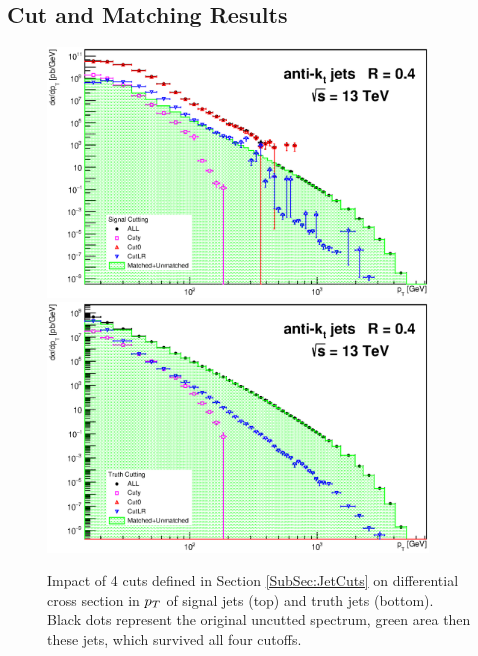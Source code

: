 \begin{appendices}

\chapter{Cut and Matching Results}
\label{App:CutAndMatchingResults}

\begin{figure}[p]
  \centering
  \includegraphics[width=0.9\textwidth]{Chapter3/SignalCutting.eps}
  \includegraphics[width=0.9\textwidth]{Chapter3/TruthCutting.eps}
  \caption{Impact of 4 cuts defined in Section \ref{SubSec:JetCuts} on
  differential cross section in $p_{T}$ of signal jets (top) and truth jets
  (bottom). Black dots represent the original uncutted spectrum, green area then
  these jets, which survived all four cutoffs.}
  \label{fig:Cutting}
\end{figure}


\end{appendices}
